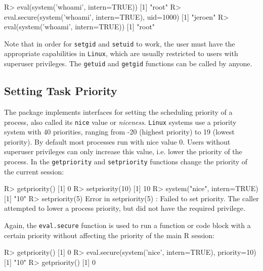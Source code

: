 \documentclass{jss}
\newcommand{\R}{\textsf{R}\xspace}
\newcommand{\RAppArmor}{\pkg{RAppArmor}\xspace}
\newcommand{\Linux}{\texttt{Linux}\xspace}
\begin{document}
\begin{CodeChunk}
\begin{CodeInput}
R> eval(system('whoami', intern=TRUE))
[1] "root"
R> eval.secure(system('whoami', intern=TRUE), uid=1000)
[1] "jeroen"
R> eval(system('whoami', intern=TRUE))
[1] "root"
\end{CodeInput}
\end{CodeChunk}

Note that in order for \texttt{setgid} and \texttt{setuid} to work, the user
must have the appropriate capabilities in \Linux, which are usually
restricted to users with superuser privileges. The \texttt{getuid} and
\texttt{getgid} functions can be called by anyone.

\subsection{Setting Task Priority}
\label{priority}

The \RAppArmor package implements interfaces for setting the scheduling priority
of a process, also called its \texttt{nice} value or \emph{niceness}. \Linux
systems use a priority system with 40 priorities, ranging from -20 (highest
priority) to 19 (lowest priority). By default most processes run with nice
value 0. Users without superuser privileges can only increase this value, i.e.
lower the priority of the process. In \RAppArmor the \texttt{getpriority} and
\texttt{setpriority} functions change the priority of the current session:

\begin{CodeChunk}
\begin{CodeInput}
R> getpriority()
[1] 0
R> setpriority(10)
[1] 10
R> system("nice", intern=TRUE)
[1] "10"
R> setpriority(5)
Error in setpriority(5) : 
  Failed to set priority. The caller attempted to lower a process priority, 
  but did not have the required privilege.
\end{CodeInput}
\end{CodeChunk}

Again, the \texttt{eval.secure} function is used to run a function or code block
with a certain priority without affecting the priority of the main \R session:

\begin{CodeChunk}
\begin{CodeInput}
R> getpriority()
[1] 0
R> eval.secure(system('nice', intern=TRUE), priority=10)
[1] "10"
R> getpriority()
[1] 0
\end{CodeInput}
\end{CodeChunk}
\end{document}
